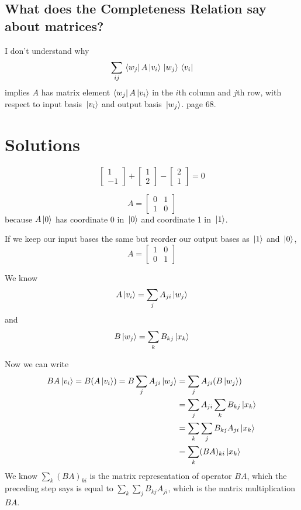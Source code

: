 \subsection{What does the Completeness Relation say about matrices?}

I don't understand why $$\sum_{ij} \bra*{w_{j}} A \ket*{v_{i}} \ket*{w_{j}} \bra*{v_{i}}$$ implies $A$ has matrix element $\bra{w_{j}} A \ket*{v_{i}}$ in the $i$th column and $j$th row, with respect to input basis $\ket*{v_{i}}$ and output basis $\ket*{w_{j}}$. page 68. 


\section{Solutions}

\exercise
$$\begin{bmatrix}
1 \\
-1
\end{bmatrix} + \begin{bmatrix}
1 \\
2 
\end{bmatrix} - \begin{bmatrix}
2 \\
1
\end{bmatrix} = 0$$

\exercise
$$A = \begin{bmatrix}
0 & 1 \\
1 & 0
\end{bmatrix}$$ because $A\ket*{0}$ has coordinate 0 in $\ket*{0}$ and coordinate 1 in $\ket*{1}$. 

If we keep our input bases the same but reorder our output bases as $\ket*{1}$ and $\ket*{0}$, 
$$A = \begin{bmatrix}
1 & 0 \\
0 & 1
\end{bmatrix}$$

\exercise 
We know 
$$A \ket*{v_{i}} = \sum_{j} A_{ji} \ket*{w_{j}}$$
and 
$$B \ket*{w_{j}} = \sum_{k} B_{kj} \ket*{x_{k}}$$

Now we can write 
$$
\begin{aligned}
BA \ket*{v_{i}} = B ( A \ket*{v_{i}} ) = B \sum_{j} A_{ji} \ket*{w_{j}} &= \sum_{j} A_{ji} (B \ket*{w_{j}}) \\
&= \sum_{j} A_{ji} \sum_{k} B_{kj} \ket*{x_{k}} \\
&= \sum_{k} \sum_{j} B_{kj} A_{ji} \ket*{x_{k}} \\
&= \sum_{k} (BA)_{ki} \ket*{x_{k}}
\end{aligned}
$$
We know $\sum_{k} (BA)_{ki}$ is the matrix representation of operator $BA$, which the preceding step says is equal to $\sum_{k} \sum_{j} B_{kj} A_{ji}$, which is the matrix multiplication $BA$. 

